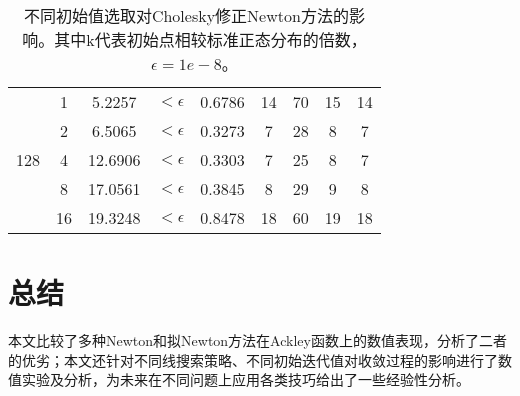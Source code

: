 \documentclass{article}
\begin{document}
\begin{table*}[h]
\begin{tabular}{c c c c c c c c c}
    \cmidrule(lr){1-9}
    \multirow{5}{*}{128} &
       1 &  5.2257 & $<\epsilon$ & 0.6786 & 14 & 70 & 15 & 14 \\
    &  2 &  6.5065 & $<\epsilon$ & 0.3273 &  7 & 28 &  8 & 7 \\
    &  4 & 12.6906 & $<\epsilon$ & 0.3303 &  7 & 25 &  8 & 7 \\
    &  8 & 17.0561 & $<\epsilon$ & 0.3845 &  8 & 29 &  9 & 8 \\
    & 16 & 19.3248 & $<\epsilon$ & 0.8478 & 18 & 60 & 19 & 18 \\
    \bottomrule
  \end{tabular}
  \caption{不同初始值选取对Cholesky修正Newton方法的影响。其中k代表初始点相较标准正态分布的倍数，$\epsilon=1e-8$。}
  \label{tab:init_value}
\end{table*}


\section{总结}
本文比较了多种Newton和拟Newton方法在Ackley函数上的数值表现，分析了二者的优劣；本文还针对不同线搜索策略、不同初始迭代值对收敛过程的影响进行了数值实验及分析，为未来在不同问题上应用各类技巧给出了一些经验性分析。


\end{document}
